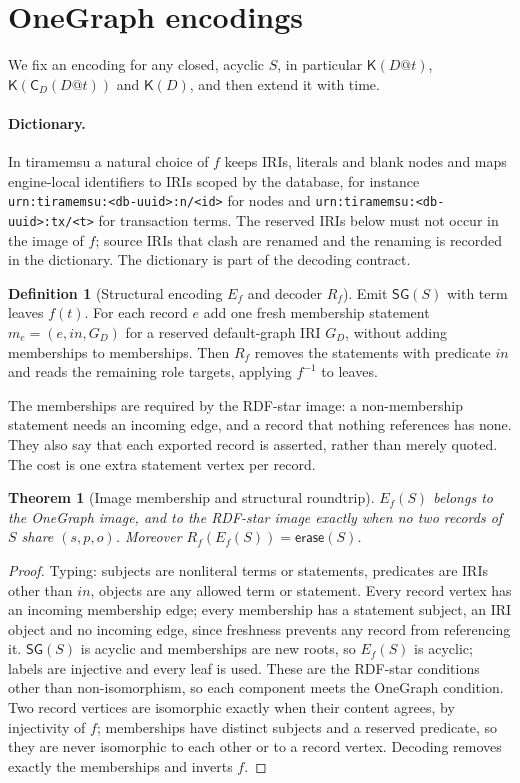 \documentclass[11pt]{article}
\theoremstyle{plain}
\newtheorem{theorem}{Theorem}
\theoremstyle{definition}
\newtheorem{definition}{Definition}
\theoremstyle{remark}
\newcommand{\SG}{\mathsf{SG}}
\newcommand{\iri}[1]{\texttt{#1}}
\newcommand{\Kernel}{\mathsf{K}}
\newcommand{\Close}{\mathsf{C}}
\newcommand{\Erase}{\mathsf{erase}}
\begin{document}
\section{OneGraph encodings}\label{sec:encoding}
We fix an encoding for any closed, acyclic $S$, in particular $\Kernel(D@t)$,
$\Kernel(\Close_D(D@t))$ and $\Kernel(D)$, and then extend it with time.

\paragraph{Dictionary.}
In tiramemsu a natural choice of $f$ keeps IRIs, literals and blank nodes and maps
engine-local identifiers to IRIs scoped by the database, for instance
\iri{urn:tiramemsu:<db-uuid>:n/<id>} for nodes and
\iri{urn:tiramemsu:<db-uuid>:tx/<t>} for transaction terms. The reserved IRIs below
must not occur in the image of $f$; source IRIs that clash are renamed and the
renaming is recorded in the dictionary. The dictionary is part of the decoding
contract.

\begin{definition}[Structural encoding $E_f$ and decoder $R_f$]\label{def:encoding}
Emit $\SG(S)$ with term leaves $f(t)$. For each record $e$ add one fresh membership
statement $m_e=(e,\mathit{in},G_D)$ for a reserved default-graph IRI $G_D$, without
adding memberships to memberships. Then $R_f$ removes the statements with predicate
$\mathit{in}$ and reads the remaining role targets, applying $f^{-1}$ to leaves.
\end{definition}

The memberships are required by the RDF-star image: a non-membership statement needs
an incoming edge, and a record that nothing references has none. They also say that
each exported record is asserted, rather than merely quoted. The cost is one extra
statement vertex per record.

\begin{theorem}[Image membership and structural roundtrip]\label{thm:image}
$E_f(S)$ belongs to the OneGraph image, and to the RDF-star image exactly when no two
records of $S$ share $(s,p,o)$. Moreover $R_f(E_f(S))=\Erase(S)$.
\end{theorem}
\begin{proof}
Typing: subjects are nonliteral terms or statements, predicates are IRIs other than
$\mathit{in}$, objects are any allowed term or statement. Every record vertex has an
incoming membership edge; every membership has a statement subject, an IRI object
and no incoming edge, since freshness prevents any record from referencing it.
$\SG(S)$ is acyclic and memberships are new roots, so $E_f(S)$ is acyclic; labels are
injective and every leaf is used. These are the RDF-star conditions other than
non-isomorphism, so each component meets the OneGraph condition. Two record vertices
are isomorphic exactly when their content agrees, by injectivity of $f$; memberships
have distinct subjects and a reserved predicate, so they are never isomorphic to
each other or to a record vertex. Decoding removes exactly the memberships and
inverts $f$.
\end{proof}
\end{document}
